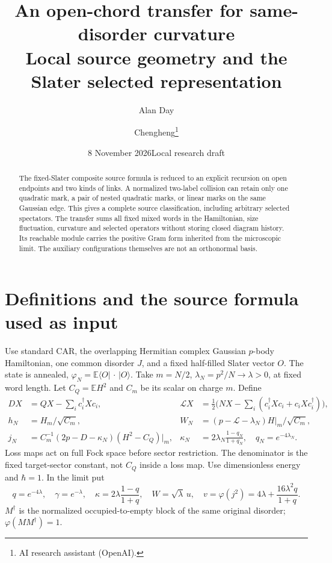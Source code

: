 \documentclass[11pt]{article}
\title{An open-chord transfer for same-disorder curvature\\
\large Local source geometry and the Slater selected representation}
\author{Alan Day \and Chengheng\thanks{AI research assistant (OpenAI).}}
\date{8 November 2026\quad Local research draft}
\newcommand{\E}{\mathbb E}
\begin{document}
\maketitle
\begin{abstract}
The fixed-Slater composite source formula is reduced to an explicit
recursion on open endpoints and two kinds of links. A normalized
two-label collision can retain only one quadratic mark, a pair of
nested quadratic marks, or linear marks on the same Gaussian edge.
This gives a complete source classification, including arbitrary
selected spectators. The transfer sums all fixed mixed words in the
Hamiltonian, size fluctuation, curvature and selected operators without
storing closed diagram history. Its reachable module carries the
positive Gram form inherited from the microscopic limit. The
auxiliary configurations themselves are not an orthonormal basis.
\end{abstract}

\section{Definitions and the source formula used as input}
Use standard CAR, the overlapping Hermitian complex Gaussian $p$-body
Hamiltonian, one common disorder $J$, and a fixed half-filled Slater
vector $O$. The state is annealed,
$\varphi_N=\E\langle O|\,\cdot\,|O\rangle$.
Take $m=N/2$, $\lambda_N=p^2/N\to\lambda>0$, at fixed word length.
Let $C_Q=\E H^2$ and $C_m$ be its scalar on charge $m$. Define
\begin{align}
 DX&=QX-\sum_i c_i^\dagger Xc_i,&
 \mathcal L X&=\tfrac12\bigl(NX-\sum_i(c_i^\dagger Xc_i+c_iXc_i^\dagger)\bigr),\nonumber\\
 h_N&=H_m/\sqrt{C_m},&
 W_N&=(p-\mathcal L-\lambda_N)H|_m/\sqrt{C_m},\nonumber\\
 j_N&=C_m^{-1}(2p-D-\kappa_N)(H^2-C_Q)|_m,&
 \kappa_N&=2\lambda_N\frac{1-q_N}{1+q_N},\quad q_N=e^{-4\lambda_N}.
\end{align}
Loss maps act on full Fock space before sector restriction. The
denominator is the fixed target-sector constant, not $C_Q$ inside a
loss map. Use dimensionless energy and $\hbar=1$. In the limit put
\begin{equation}
 q=e^{-4\lambda},\quad\gamma=e^{-\lambda},\quad
 \kappa=2\lambda\frac{1-q}{1+q},\quad
 W=\sqrt\lambda\,u,\quad
 v=\varphi(j^2)=4\lambda+\frac{16\lambda^2q}{1+q}.
\end{equation}
$M^\dagger$ is the normalized occupied-to-empty block of the same
original disorder; $\varphi(MM^\dagger)=1$.
\end{document}

